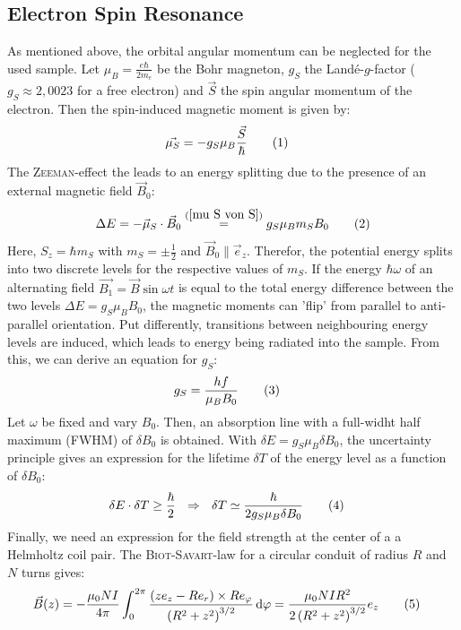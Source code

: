 \documentclass[a4paper,12pt]{article}
\newcommand\numberthis{\addtocounter{equation}{1}\tag{\theequation}}
\newcommand{\intx}{}
\newcommand{\kla}{}
\begin{document}
\subsection{Electron Spin Resonance}
As mentioned above, the orbital angular momentum can be neglected for the used sample. Let $\mu_B=\frac{e\hbar}{2m_e}$ be the Bohr magneton, $g_S$ the Landé-$g$-factor ($g_S\approx 2,0023$ for a free electron) and $\vec{S}$ the spin angular momentum of the electron. Then the spin-induced magnetic moment is given by:
\begin{align*}
\vec{\mu_S}&=-g_S\mu_B\frac{\vec{S}}{\hbar}\numberthis\label{mu S von S}
\end{align*}
The \textsc{Zeeman}-effect the leads to an energy splitting due to the presence of an external magnetic field $\vec{B}_0$:
\begin{align*}
\Delta E=-\vec{\mu}_S\cdot\vec{B}_0\overset{(\ref{mu S von S})}{=}g_S\mu_Bm_SB_0 \numberthis\label{delta E von ms und B0}
\end{align*}
Here, $S_z=\hbar m_S$ with $m_S=\pm\frac{1}{2}$ and $\vec{B}_0\parallel \vec{e}_z$. Therefor, the potential energy splits into two discrete levels for the respective values of $m_S$. If the energy $\hbar\omega$ of an alternating field $\vec{B_1}=\vec{B}\sin\omega t$ is equal to the total energy difference between the two levels $\Delta E=g_S\mu_BB_0$, the magnetic moments can 'flip' from parallel to anti-parallel orientation. Put differently, transitions between neighbouring energy levels are induced, which leads to energy being radiated into the sample. From this, we can derive an equation for $g_S$:
\begin{align*}
g_S&=\frac{hf}{\mu_BB_0}\numberthis\label{gS von f und B0}
\end{align*}
Let $\omega$ be fixed and vary $B_0$. Then, an absorption line with a full-widht half maximum (FWHM) of $\delta B_0$ is obtained. With $\delta E=g_S\mu_B\delta B_0$, the uncertainty principle gives an expression for the lifetime $\delta T$ of the energy level as a function of $\delta B_0$:
\begin{align*}
\delta E\cdot\delta T&\ge\frac{\hbar}{2}\ \ \Rightarrow\ \ \delta T\simeq\frac{\hbar}{2g_S\mu_B\delta B_0}\numberthis\label{delta T von delta B0}
\end{align*}
Finally, we need an expression for the field strength at the center of a a Helmholtz coil pair. The \textsc{Biot-Savart}-law for a circular conduit of radius $R$ and $N$ turns gives:
\begin{align*}
\vec{B}(z)&=-\frac{\mu_0NI}{4\pi}\intx\int_{0}^{2\pi}\frac{\kla\left( {ze_z-Re_r} \right)\times Re_\varphi}{\kla\left( {R^2+z^2} \right)^{3/2}}\,\mathrm{d}\varphi=\frac{\mu_0NIR^2}{2\kla\left( {R^2+z^2} \right)^{3/2}}e_z\numberthis\label{B field coil}
\end{align*}
\end{document}
